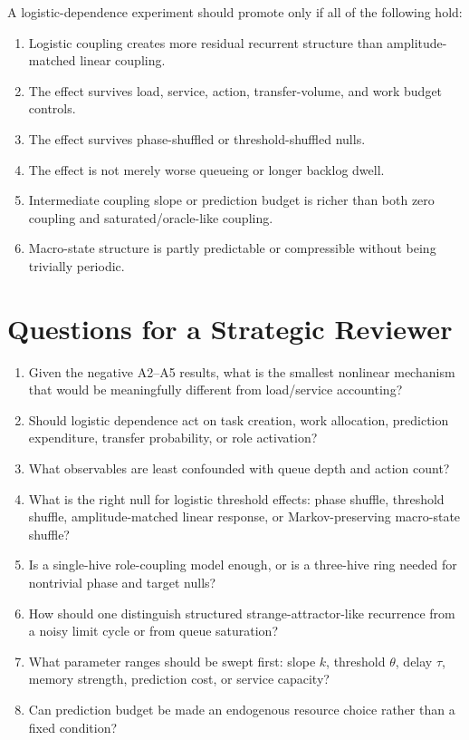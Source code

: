 \documentclass[11pt]{article}
\begin{document}
A logistic-dependence experiment should promote only if all of the following
hold:

\begin{enumerate}
\item Logistic coupling creates more residual recurrent structure than
amplitude-matched linear coupling.
\item The effect survives load, service, action, transfer-volume, and work
budget controls.
\item The effect survives phase-shuffled or threshold-shuffled nulls.
\item The effect is not merely worse queueing or longer backlog dwell.
\item Intermediate coupling slope or prediction budget is richer than both
zero coupling and saturated/oracle-like coupling.
\item Macro-state structure is partly predictable or compressible without being
trivially periodic.
\end{enumerate}

\section{Questions for a Strategic Reviewer}

\begin{enumerate}
\item Given the negative A2--A5 results, what is the smallest nonlinear
mechanism that would be meaningfully different from load/service accounting?
\item Should logistic dependence act on task creation, work allocation,
prediction expenditure, transfer probability, or role activation?
\item What observables are least confounded with queue depth and action count?
\item What is the right null for logistic threshold effects: phase shuffle,
threshold shuffle, amplitude-matched linear response, or Markov-preserving
macro-state shuffle?
\item Is a single-hive role-coupling model enough, or is a three-hive ring
needed for nontrivial phase and target nulls?
\item How should one distinguish structured strange-attractor-like recurrence
from a noisy limit cycle or from queue saturation?
\item What parameter ranges should be swept first: slope $k$, threshold
$\theta$, delay $\tau$, memory strength, prediction cost, or service capacity?
\item Can prediction budget be made an endogenous resource choice rather than
a fixed condition?
\end{enumerate}
\end{document}
